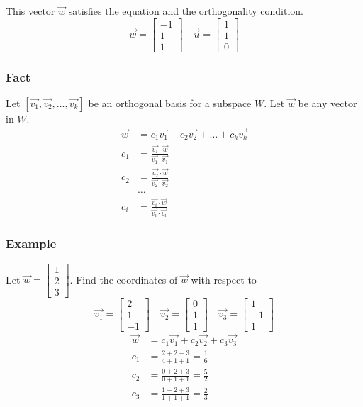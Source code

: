 \documentclass{math}
\begin{document}
This vector \( \vec{w} \) satisfies the equation and the orthogonality
condition.
\[ \vec{w} = \begin{bmatrix}-1 \\ 1 \\ 1\end{bmatrix} \quad
  \vec{u} = \begin{bmatrix}1 \\ 1 \\ 0\end{bmatrix} \]

\subsubsection*{Fact}
Let \( [\vec{v_1},\vec{v_2},\dots,\vec{v_k}] \) be an orthogonal basis for a
subspace \( W \). Let \( \vec{w} \) be any vector in \( W \).
\begin{align*}
  \vec{w} &= c_1\vec{v_1}+c_2\vec{v_2}+\dots+c_k\vec{v_k} \\
  c_1 &= \frac{\vec{v_1}\cdot\vec{w}}{\vec{v_1}\cdot\vec{v_1}} \\
  c_2 &= \frac{\vec{v_2}\cdot\vec{w}}{\vec{v_2}\cdot\vec{v_2}} \\
  &\dots \\
  c_i &= \frac{\vec{v_i}\cdot\vec{w}}{\vec{v_i}\cdot\vec{v_i}}
\end{align*}

\subsubsection*{Example}
Let \( \vec{w} = \begin{bmatrix}1 \\ 2 \\ 3\end{bmatrix} \). Find the
coordinates of \( \vec{w} \) with respect to
\[ \vec{v_1} = \begin{bmatrix}2 \\ 1 \\ -1\end{bmatrix}\quad
  \vec{v_2} = \begin{bmatrix}0 \\ 1 \\ 1\end{bmatrix}\quad
  \vec{v_3} = \begin{bmatrix}1 \\ -1 \\ 1\end{bmatrix} \]
\begin{align*}
  \vec{w} &= c_1\vec{v_1}+c_2\vec{v_2}+c_3\vec{v_3} \\
  c_1 &= \frac{2+2-3}{4+1+1} = \frac{1}{6} \\
  c_2 &= \frac{0+2+3}{0+1+1} = \frac{5}{2} \\
  c_3 &= \frac{1-2+3}{1+1+1} = \frac{2}{3}
\end{align*}
\end{document}

